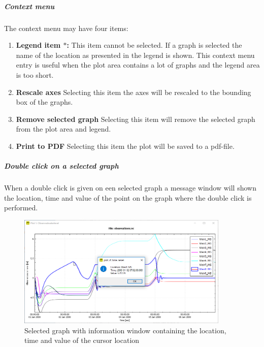 \documentclass{deltares_memo}
\begin{document}
\subparagraph*{Context menu}
The context menu may have four items:
\begin{enumerate}
    \item \textbf{Legend item $\ast$:}\newline
    This item cannot be selected. 
    If a graph is selected the name of the location as presented in the legend is shown. 
    This context menu entry is useful when the plot area contains a lot of graphs and the legend area is too short.
    \item \textbf{Rescale axes}\newline
    Selecting this item the axes will be rescaled to the bounding box of the graphs.
    \item \textbf{Remove selected graph}\newline
    Selecting this item will remove the selected graph from the plot area and legend.
    \item \textbf{Print to PDF}\newline
    Selecting this item the plot will be saved to a pdf-file.
\end{enumerate}

\subparagraph*{Double click on a selected graph}
When a double click is given on een selected graph a message window will shown the location, time and value of the point on the graph where the double click is performed.
\begin{figure}[H]
    \centering    
    \includegraphics[width=0.9\textwidth]{pictures/plot_double_click_selected_graph.png}
    \caption{Selected graph with information window containing the location, time and value of the cursor location\label{fig:double_click_selected_graph}}
\end{figure}
\end{document}
